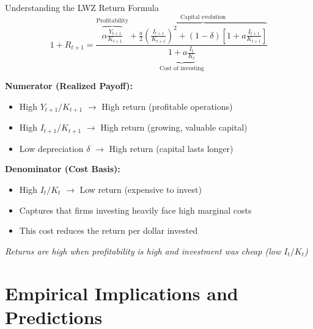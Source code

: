 \documentclass{beamer}
\begin{document}
\begin{frame}{Understanding the LWZ Return Formula}
    \begin{equation*}
        1 + R_{t+1} = \frac{\overbrace{\alpha \frac{Y_{t+1}}{K_{t+1}}}^{\text{Profitability}} + \overbrace{\frac{a}{2}\left(\frac{I_{t+1}}{K_{t+1}}\right)^2 + (1-\delta)\left[1 + a\frac{I_{t+1}}{K_{t+1}}\right]}^{\text{Capital evolution}}}{\underbrace{1 + a\frac{I_t}{K_t}}_{\text{Cost of investing}}}
    \end{equation*}

    \textbf{Numerator (Realized Payoff):}
    \begin{itemize}
        \item High $Y_{t+1}/K_{t+1}$ $\rightarrow$ High return (profitable operations)
        \item High $I_{t+1}/K_{t+1}$ $\rightarrow$ High return (growing, valuable capital)
        \item Low depreciation $\delta$ $\rightarrow$ High return (capital lasts longer)
    \end{itemize}

    \textbf{Denominator (Cost Basis):}
    \begin{itemize}
        \item High $I_t/K_t$ $\rightarrow$ Low return (expensive to invest)
        \item Captures that firms investing heavily face high marginal costs
        \item This cost reduces the return per dollar invested
    \end{itemize}

    \textit{Returns are high when profitability is high and investment was cheap (low $I_t/K_t$)}
\end{frame}

\section{Empirical Implications and Predictions}
\end{document}
